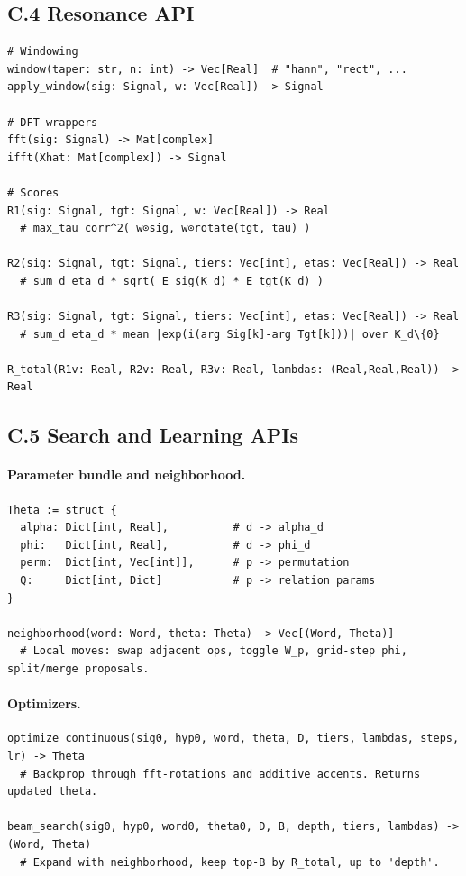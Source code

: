 \documentclass[12pt]{article}
\numberwithin{equation}{section}
\theoremstyle{plain}
\theoremstyle{definition}
\theoremstyle{remark}
\begin{document}
\subsection*{C.4 Resonance API}
\begin{verbatim}
# Windowing
window(taper: str, n: int) -> Vec[Real]  # "hann", "rect", ...
apply_window(sig: Signal, w: Vec[Real]) -> Signal

# DFT wrappers
fft(sig: Signal) -> Mat[complex]
ifft(Xhat: Mat[complex]) -> Signal

# Scores
R1(sig: Signal, tgt: Signal, w: Vec[Real]) -> Real
  # max_tau corr^2( w⊙sig, w⊙rotate(tgt, tau) )

R2(sig: Signal, tgt: Signal, tiers: Vec[int], etas: Vec[Real]) -> Real
  # sum_d eta_d * sqrt( E_sig(K_d) * E_tgt(K_d) )

R3(sig: Signal, tgt: Signal, tiers: Vec[int], etas: Vec[Real]) -> Real
  # sum_d eta_d * mean |exp(i(arg Sig[k]-arg Tgt[k]))| over K_d\{0}

R_total(R1v: Real, R2v: Real, R3v: Real, lambdas: (Real,Real,Real)) -> Real
\end{verbatim}

\subsection*{C.5 Search and Learning APIs}
\paragraph{Parameter bundle and neighborhood.}
\begin{verbatim}
Theta := struct {
  alpha: Dict[int, Real],          # d -> alpha_d
  phi:   Dict[int, Real],          # d -> phi_d
  perm:  Dict[int, Vec[int]],      # p -> permutation
  Q:     Dict[int, Dict]           # p -> relation params
}

neighborhood(word: Word, theta: Theta) -> Vec[(Word, Theta)]
  # Local moves: swap adjacent ops, toggle W_p, grid-step phi, split/merge proposals.
\end{verbatim}

\paragraph{Optimizers.}
\begin{verbatim}
optimize_continuous(sig0, hyp0, word, theta, D, tiers, lambdas, steps, lr) -> Theta
  # Backprop through fft-rotations and additive accents. Returns updated theta.

beam_search(sig0, hyp0, word0, theta0, D, B, depth, tiers, lambdas) -> (Word, Theta)
  # Expand with neighborhood, keep top-B by R_total, up to 'depth'.
\end{verbatim}
\end{document}

